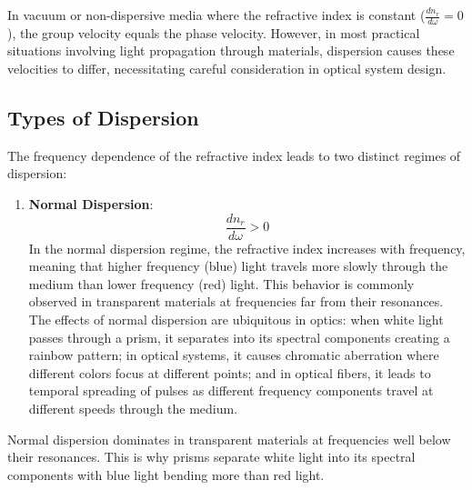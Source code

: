 \documentclass[
  a4paper,
]{book}
\providecommand{\tightlist}{%
  \setlength{\itemsep}{0pt}\setlength{\parskip}{0pt}}
\begin{document}
In vacuum or non-dispersive media where the refractive index is constant
(\(\frac{dn_r}{d\omega}=0\)), the group velocity equals the phase
velocity. However, in most practical situations involving light
propagation through materials, dispersion causes these velocities to
differ, necessitating careful consideration in optical system design.

\subsection{Types of Dispersion}\label{types-of-dispersion}

The frequency dependence of the refractive index leads to two distinct
regimes of dispersion:

\begin{enumerate}
\def\labelenumi{\arabic{enumi}.}
\tightlist
\item
  \textbf{Normal Dispersion}: \[
  \frac{dn_r}{d\omega}>0
  \] In the normal dispersion regime, the refractive index increases
  with frequency, meaning that higher frequency (blue) light travels
  more slowly through the medium than lower frequency (red) light. This
  behavior is commonly observed in transparent materials at frequencies
  far from their resonances. The effects of normal dispersion are
  ubiquitous in optics: when white light passes through a prism, it
  separates into its spectral components creating a rainbow pattern; in
  optical systems, it causes chromatic aberration where different colors
  focus at different points; and in optical fibers, it leads to temporal
  spreading of pulses as different frequency components travel at
  different speeds through the medium.
\end{enumerate}

\begin{tcolorbox}[enhanced jigsaw, coltitle=black, title=\textcolor{quarto-callout-note-color}{\faInfo}\hspace{0.5em}{Note}, colframe=quarto-callout-note-color-frame, toprule=.15mm, opacitybacktitle=0.6, left=2mm, opacityback=0, breakable, toptitle=1mm, bottomtitle=1mm, leftrule=.75mm, arc=.35mm, titlerule=0mm, colbacktitle=quarto-callout-note-color!10!white, rightrule=.15mm, bottomrule=.15mm, colback=white]

Normal dispersion dominates in transparent materials at frequencies well
below their resonances. This is why prisms separate white light into its
spectral components with blue light bending more than red light.

\end{tcolorbox}
\end{document}
